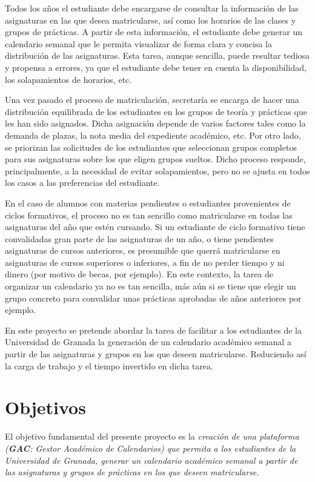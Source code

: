 Todos los años el estudiante debe encargarse de consultar la información de las asignaturas en las que desea matricularse, así como los horarios de las clases y grupos de prácticas. A partir de esta información, el estudiante debe generar un calendario semanal que le permita visualizar de forma clara y concisa la distribución de las asignaturas. Esta tarea, aunque sencilla, puede resultar tediosa y propensa a errores, ya que el estudiante debe tener en cuenta la disponibilidad, los solapamientos de horarios, etc.\newline

Una vez pasado el proceso de matriculación, secretaría se encarga de hacer una distribución equilibrada de los estudiantes en los grupos de teoría y prácticas que les han sido asignados. Dicha asignación depende de varios factores tales como la demanda de plazas, la nota media del expediente académico, etc. Por otro lado, se priorizan las solicitudes de los estudiantes que seleccionan grupos completos para sus asignaturas sobre los que eligen grupos sueltos. Dicho proceso responde, principalmente, a la necesidad de evitar solapamientos, pero no se ajusta en todos los casos a las preferencias del estudiante.\newline

En el caso de alumnos con materias pendientes o estudiantes provenientes de ciclos formativos, el proceso no es tan sencillo como matricularse en todas las asignaturas del año que estén cursando.
Si un estudiante de ciclo formativo tiene convalidadas gran parte de las asignaturas de un año, o tiene pendientes asignaturas de cursos anteriores, es presumible que querrá matricularse en asignaturas de cursos superiores o inferiores, a fin de no perder tiempo y ni dinero (por motivo de becas, por ejemplo). En este contexto, la tarea de organizar un calendario ya no es tan sencilla, más aún si se tiene que elegir un grupo concreto para convalidar unas prácticas aprobadas de años anteriores por ejemplo.\newline

En este proyecto se pretende abordar la tarea de facilitar a los estudiantes de la Universidad de Granada la generación de un calendario académico semanal a partir de las asignaturas y grupos en los que deseen matricularse. Reduciendo así la carga de trabajo y el tiempo invertido en dicha tarea.

\section{Objetivos}
El objetivo fundamental del presente proyecto es la \textit{creación de una plataforma (\textbf{GAC}: Gestor Académico de Calendarios) que permita a los estudiantes de la Universidad de Granada, generar un calendario académico semanal a partir de las asignaturas y grupos de prácticas en los que deseen matricularse.}\newpage

